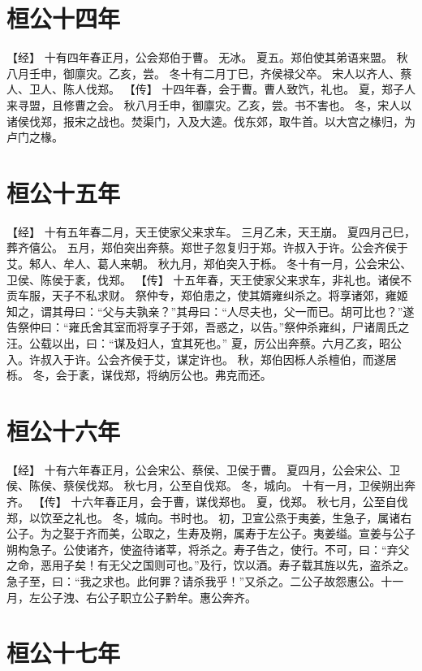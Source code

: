 \documentclass[a4paper,12pt,UTF8,twoside]{ctexbook}
\begin{document}
\chapter{桓公十四年}

【经】
十有四年春正月，公会郑伯于曹。
无冰。
夏五。郑伯使其弟语来盟。
秋八月壬申，御廪灾。乙亥，尝。
冬十有二月丁巳，齐侯禄父卒。
宋人以齐人、蔡人、卫人、陈人伐郑。
【传】
十四年春，会于曹。曹人致饩，礼也。
夏，郑子人来寻盟，且修曹之会。
秋八月壬申，御廪灾。乙亥，尝。书不害也。
冬，宋人以诸侯伐郑，报宋之战也。焚渠门，入及大逵。伐东郊，取牛首。以大宫之椽归，为卢门之椽。

\chapter{桓公十五年}

【经】
十有五年春二月，天王使家父来求车。
三月乙未，天王崩。
夏四月己巳，葬齐僖公。
五月，郑伯突出奔蔡。郑世子忽复归于郑。许叔入于许。公会齐侯于艾。邾人、牟人、葛人来朝。
秋九月，郑伯突入于栎。
冬十有一月，公会宋公、卫侯、陈侯于袲，伐郑。
【传】
十五年春，天王使家父来求车，非礼也。诸侯不贡车服，天子不私求财。
祭仲专，郑伯患之，使其婿雍纠杀之。将享诸郊，雍姬知之，谓其母曰：“父与夫孰亲？”其母曰：“人尽夫也，父一而已。胡可比也？”遂告祭仲曰：“雍氏舍其室而将享子于郊，吾惑之，以告。”祭仲杀雍纠，尸诸周氏之汪。公载以出，曰：“谋及妇人，宜其死也。”
夏，厉公出奔蔡。六月乙亥，昭公入。许叔入于许。公会齐侯于艾，谋定许也。
秋，郑伯因栎人杀檀伯，而遂居栎。
冬，会于袲，谋伐郑，将纳厉公也。弗克而还。

\chapter{桓公十六年}

【经】
十有六年春正月，公会宋公、蔡侯、卫侯于曹。
夏四月，公会宋公、卫侯、陈侯、蔡侯伐郑。
秋七月，公至自伐郑。
冬，城向。
十有一月，卫侯朔出奔齐。
【传】
十六年春正月，会于曹，谋伐郑也。
夏，伐郑。
秋七月，公至自伐郑，以饮至之礼也。
冬，城向。书时也。
初，卫宣公烝于夷姜，生急子，属诸右公子。为之娶于齐而美，公取之，生寿及朔，属寿于左公子。夷姜缢。宣姜与公子朔构急子。公使诸齐，使盗待诸莘，将杀之。寿子告之，使行。不可，曰：“弃父之命，恶用子矣！有无父之国则可也。”及行，饮以酒。寿子载其旌以先，盗杀之。急子至，曰：“我之求也。此何罪？请杀我乎！”又杀之。二公子故怨惠公。十一月，左公子洩、右公子职立公子黔牟。惠公奔齐。

\chapter{桓公十七年}
\end{document}
